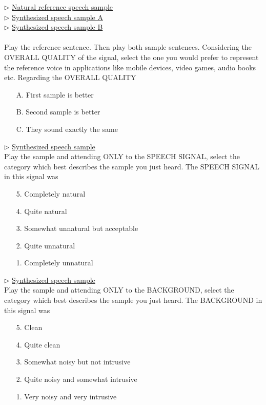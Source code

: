 \begin{table}[width=8cm]
	\begin{framed}
	$\rhd$ \underline{Natural reference speech sample}\\
	$\rhd$ \underline{Synthesized speech sample A}\\
	$\rhd$ \underline{Synthesized speech sample B}\\
	\\
	Play the reference sentence. Then play both sample sentences. Considering the OVERALL QUALITY of the signal, select the one you would prefer to represent the reference voice in applications like mobile devices, video games, audio books etc. Regarding the OVERALL QUALITY
	\begin{itemize}
	\item[A.] First sample is better
	\item[B.] Second sample is better
	\item[C.] They sound exactly the same
	\end{itemize}
	\end{framed}
	\begin{framed}
	$\rhd$ \underline{Synthesized speech sample}\\
	Play the sample and attending ONLY to the SPEECH SIGNAL, select the category which best describes the sample you just heard. The SPEECH SIGNAL in this signal was
	\begin{itemize}
	\item[5.] Completely natural
	\item[4.] Quite natural
	\item[3.] Somewhat unnatural but acceptable
	\item[2.] Quite unnatural
	\item[1.] Completely unnatural
	\end{itemize}
	\end{framed}
	\begin{framed}
	$\rhd$ \underline{Synthesized speech sample}\\
	Play the sample and attending ONLY to the BACKGROUND, select the category which best describes the sample you just heard. The BACKGROUND in this signal was
	\begin{itemize}
	\item[5.] Clean
	\item[4.] Quite clean
	\item[3.] Somewhat noisy but not intrusive
	\item[2.] Quite noisy and somewhat intrusive
	\item[1.] Very noisy and very intrusive

\end{itemize}
\end{framed}
\end{table}
